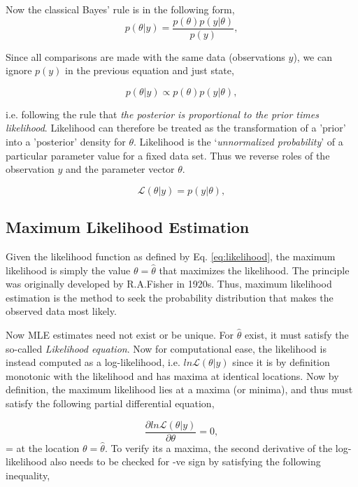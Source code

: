 \documentclass[a4paper,10pt]{article}
\begin{document}
Now the classical Bayes' rule is in the following form,
\begin{equation}
 p(\theta|y) = \frac{p(\theta)p(y|\theta)}{p(y)},
\end{equation}

Since all comparisons are made with the same data (observations $y$), we can ignore $p(y)$ in the previous equation and just state,

\begin{equation}
 p(\theta|y) \propto p(\theta)p(y|\theta),
\end{equation}

i.e. following the rule that \emph{the posterior is proportional to the prior times likelihood}. Likelihood can therefore be treated as the transformation of a 'prior' into a 'posterior' density for $\theta$. Likelihood is the `\emph{unnormalized probability}' of a particular parameter value for a fixed data set. Thus we reverse roles of the observation $y$ and the parameter vector $\theta$. 

\begin{equation}
 \mathcal{L}(\theta|y) = p(y | \theta), 
\label{eq:likelihood}
 \end{equation}
 
 \subsection{Maximum Likelihood Estimation}
Given the likelihood function as defined by Eq. \eqref{eq:likelihood}, the maximum likelihood is simply the value $\theta = \hat{\theta}$ that maximizes the likelihood. The principle was originally developed by   R.A.Fisher in 1920s. Thus, maximum likelihood estimation is the method to seek the probability distribution that makes the observed data most likely.

Now MLE estimates need not exist or be unique. For $\hat{\theta}$ exist, it must satisfy the so-called \emph{Likelihood equation}. Now for computational ease, the likelihood is instead computed as a log-likelihood, i.e. $ln \mathcal{L}(\theta|y)$ since it is by definition monotonic with the likelihood and has maxima at identical locations. Now by definition, the maximum likelihood lies at a maxima (or minima), and thus must satisfy the following partial differential equation,

\begin{equation}
 \frac{\partial ln \mathcal{L} (\theta|y)}{\partial \theta} = 0,
 \label{eq:likelihood_eqn}
\end{equation} = 
at the location $\theta = \hat{\theta}$. To verify its a maxima, the second derivative of the log-likelihood also needs to be checked for -ve sign by satisfying the following inequality,
\end{document}
